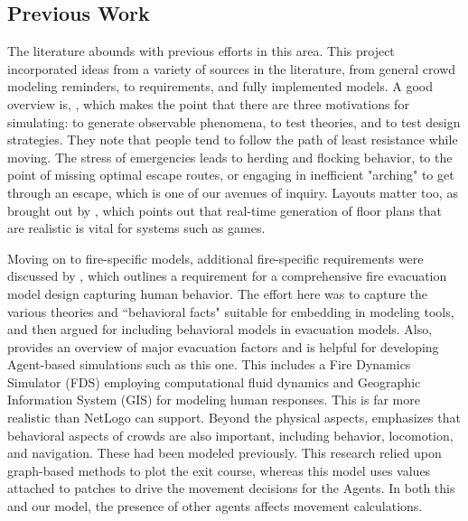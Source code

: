 \documentclass[12pt,letterpaper]{article}
\begin{document}
 
\subsection{Previous Work}
The literature abounds with previous efforts in this area. This project incorporated ideas from a variety of sources in the literature, from general crowd modeling reminders, to requirements, and fully implemented models. A good overview is, \cite{almeidaCrowdSimulationModeling2013}, which makes the point that there are three motivations for simulating: to generate observable phenomena, to test theories, and to test design strategies. They note that people tend to follow the path of least resistance while moving. The stress of emergencies leads to herding and flocking behavior, to the point of missing optimal escape routes, or engaging in inefficient "arching" to get through an escape, which is one of our avenues of inquiry. Layouts matter too, as brought out by \cite{mirahmadiNovelAlgorithmRealtime2012}, which points out that real-time generation of floor plans that are realistic is vital for systems such as  games.


Moving on to fire-specific models, additional fire-specific requirements were discussed by \cite{kuligowskil}, which outlines a requirement for a comprehensive fire evacuation model design capturing human behavior. The effort here was to capture the various theories and ``behavioral facts" suitable for embedding in modeling tools, and then argued for including behavioral models in evacuation models. Also, \cite{abmEvac} provides an overview of major evacuation factors and is helpful for developing Agent-based simulations such as this one. This includes a Fire Dynamics Simulator (FDS) employing computational fluid dynamics and Geographic Information System (GIS) for modeling human responses. This is far more realistic than NetLogo can support. Beyond the physical aspects, \cite{kneidl} emphasizes that behavioral aspects of crowds are also important, including behavior, locomotion, and navigation. These had been modeled previously. This research relied upon graph-based methods to plot the exit course, whereas this model uses values attached to patches to drive the movement decisions for the Agents. In both this and our model, the presence of other agents affects movement calculations.
\end{document}
